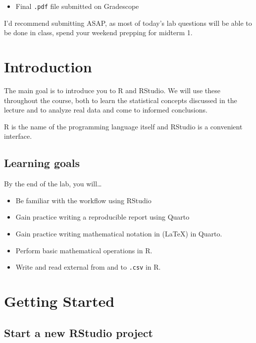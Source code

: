 \documentclass[
]{article}
\providecommand{\tightlist}{%
  \setlength{\itemsep}{0pt}\setlength{\parskip}{0pt}}
\begin{document}
\begin{itemize}
\tightlist
\item
  Final \texttt{.pdf} file submitted on Gradescope
\end{itemize}

I'd recommend submitting ASAP, as most of today's lab questions will be
able to be done in class, spend your weekend prepping for midterm 1.

\section{Introduction}\label{introduction}

The main goal is to introduce you to R and RStudio. We will use these
throughout the course, both to learn the statistical concepts discussed
in the lecture and to analyze real data and come to informed
conclusions.

R is the name of the programming language itself and RStudio is a
convenient interface.

\subsection{Learning goals}\label{learning-goals}

By the end of the lab, you will\ldots{}

\begin{itemize}
\tightlist
\item
  Be familiar with the workflow using RStudio
\item
  Gain practice writing a reproducible report using Quarto
\item
  Gain practice writing mathematical notation in (LaTeX) in Quarto.
\item
  Perform basic mathematical operations in R.
\item
  Write and read external from and to \texttt{.csv} in R.
\end{itemize}

\section{Getting Started}\label{getting-started}

\subsection{Start a new RStudio
project}\label{start-a-new-rstudio-project}
\end{document}

